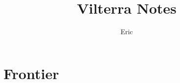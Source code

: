 \documentclass[10pt,twoside,twocolumn,openany,nodeprecatedcode]{dndbook}
\title{Vilterra Notes}
\author{Eric}
\begin{document}
\maketitle

\chapter{Frontier}%
\label{cha:Frontier}


\end{document}
